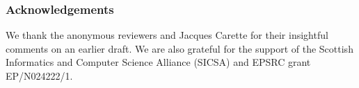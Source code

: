 \documentclass{llncs}
\begin{document}






\subsubsection*{Acknowledgements}
We thank the anonymous reviewers and Jacques Carette for their insightful
comments on an earlier draft. We are also grateful for the support of
the Scottish Informatics and Computer Science Alliance (SICSA) and
EPSRC grant EP/N024222/1.



\end{document}
